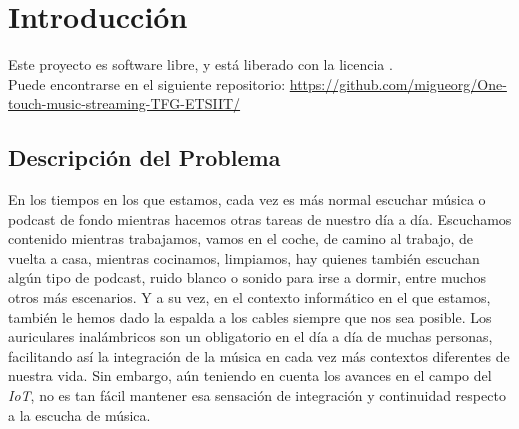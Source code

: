 \chapter{Introducción}

Este proyecto es software libre, y está liberado con la licencia \cite{gplv3}.\\

Puede encontrarse en el siguiente repositorio: \url{https://github.com/migueorg/One-touch-music-streaming-TFG-ETSIIT/}

\section{Descripción del Problema}
En los tiempos en los que estamos, cada vez es más normal escuchar música o podcast de fondo mientras hacemos otras tareas de nuestro día a día. Escuchamos contenido mientras trabajamos, vamos en el coche, de camino al trabajo, de vuelta a casa, mientras cocinamos, limpiamos, hay quienes también escuchan algún tipo de podcast, ruido blanco o sonido para irse a dormir, entre muchos otros más escenarios. Y a su vez, en el contexto informático en el que estamos, también le hemos dado la espalda a los cables siempre que nos sea posible. Los auriculares inalámbricos son un obligatorio en el día a día de muchas personas, facilitando así la integración de la música en cada vez más contextos diferentes de nuestra vida. Sin embargo, aún teniendo en cuenta los avances en el campo del \emph{IoT}, no es tan fácil mantener esa sensación de integración y continuidad respecto a la escucha de música.\\

